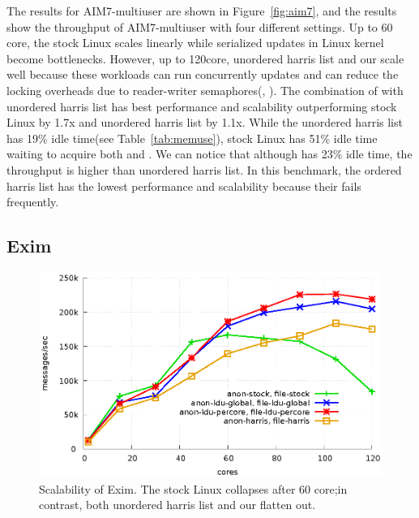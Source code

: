 \ifkor
The results for AIM7-multiuser are shown in Figure~\ref{fig:aim7}, and the
results show the throughput of AIM7-multiuser with four different settings.
Up to 60 core, the stock Linux scales linearly while serialized updates in
Linux kernel become bottlenecks. 
However, up to 120core, unordered harris list and our  scale well because
these workloads can run concurrently updates and can reduce the locking
overheads due to reader-writer semaphores(,
).
The combination of  with unordered harris list has best performance and
scalability outperforming stock Linux by 1.7x and unordered harris list by
1.1x.
While the unordered harris list has 19\% idle time(see
Table~\ref{tab:memuse}), stock Linux has 51\% idle time waiting to acquire
both  and .
We can notice that although  has 23\% idle time, the throughput is higher than
unordered harris list.
In this benchmark, the ordered harris list has the lowest performance and
scalability because their  fails frequently.
\else
\fi

\subsection{Exim}

\begin{figure}[tb]
  \begin{center}
    \includegraphics[scale=0.65]{graph/exim.eps}
  \end{center}
  \caption{Scalability of Exim. The stock Linux collapses after 60 core;in
  contrast, both unordered harris list and our  flatten out.}
  \label{fig:exim}
\end{figure}

